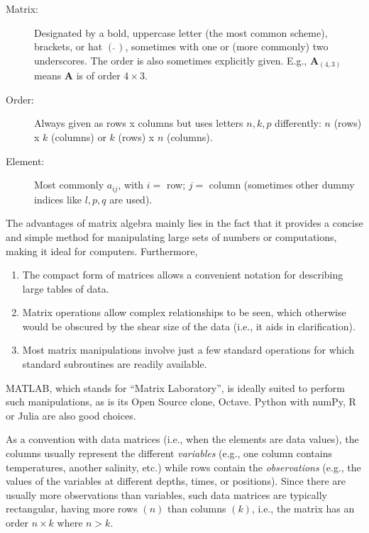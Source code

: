 \begin{description}

\item [Matrix:] Designated by a bold, uppercase letter (the most common scheme), brackets, or hat $(\hat{ \ })$,
sometimes with one or (more commonly) two underscores.
The order is also sometimes explicitly given.  E.g., $\mathbf{A}_{(4,3)}$ means 
$\mathbf A$ is of order $4 \times 3$.

\item [Order:] Always given as rows x columns but uses letters $n,k,p$ differently: $n$ (rows) x $k$ (columns) or 
$k$ (rows) x $n$ (columns).

\item [Element:] Most commonly $a_{ij}$, with $i =$ row; $j =$ column (sometimes other dummy indices like $l,p,q$ are used).
\end{description}

The advantages of matrix algebra mainly lies in the fact that it provides a concise and simple 
method for manipulating large sets of numbers or computations, making it ideal for computers. 
Furthermore,

\begin{enumerate}

\item The compact form of matrices allows a convenient notation for describing large tables of data.

\item Matrix operations allow complex relationships to be seen, which otherwise would be obscured by the 
shear size of the data (i.e., it aids in clarification).

\item Most matrix manipulations involve just a 
few standard operations for which standard subroutines are readily available.
\end{enumerate}

MATLAB, which stands for ``Matrix Laboratory'', is ideally suited to perform such manipulations,
as is its Open Source clone, Octave. Python with numPy, R or Julia are also good choices.

	As a convention with data matrices (i.e., when the elements are data values), the columns 
usually represent the different \emph{variables} (e.g., one column contains temperatures, another salinity, 
etc.) while rows contain the \emph{observations} (e.g., the values of the variables at different depths, times, or positions). Since 
there are usually more observations than variables, such data matrices are typically rectangular, having 
more rows $(n)$ than columns $(k)$, i.e., the matrix has an order $n \times k$ where $n > k$.

